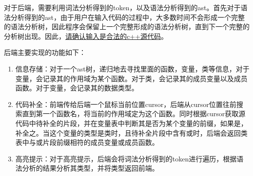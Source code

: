 对于后端，需要利用词法分析得到的token，以及语法分析得到的ast。首先对于语法分析得到的ast，由于用户在输入代码的过程中，大多数时间不会形成一个完整的语法分析树，因此程序会保留上一个完整形成的语法分析树，直到下一个完整的分析树出现。因此，\underline{请确认输入是合法的c++源代码}。

后端主要实现的功能如下：
\begin{enumerate}
    \item 信息存储：对于一个ast树，递归地去寻找里面的函数，变量，类等信息，对于变量，会记录其的作用域为某个函数。对于类，会记录其的成员变量以及成员函数。对于变量，会记录其的数据类型。
    \item 代码补全：前端传给后端一个鼠标当前位置cursor，后端从cursor位置往前搜索直到第一个函数名，将当前的作用域定为这个函数。同时根据cursor获取源代码中待补全的片段，并在变量表中判断其是否为某个变量的前缀，如果是，补全之。当这个变量的类型是类时，且待补全片段中含有或\code{->}时，后端会返回类表中与或\code{->}片段前缀相符的成员变量或成员函数。
    \item 高亮提示：对于高亮提示，后端会将词法分析得到的token进行遍历，根据语法分析的结果分析其类型，并将类型返回前端。
\end{enumerate}


